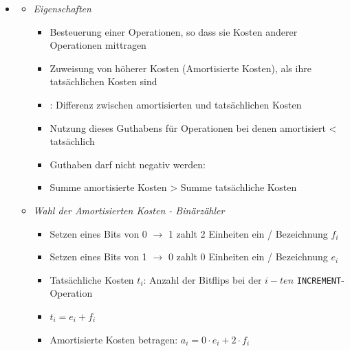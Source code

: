 \documentclass[
    12pt,
    a4paper,
    ngerman,
    color=3b,%
    marginpar=false,
    colorback=false,
    leqno,
]{tudaexercise}
\begin{document}
\begin{itemize}
\begin{itemize}
\begin{itemize}
                    \end{itemize}
            \end{itemize}

\pagebreak

        \item {}
            \begin{itemize}
                \item \textit{Eigenschaften}
                    \begin{itemize}
                        \item Besteuerung einer Operationen, so dass sie Kosten anderer Operationen mittragen
                        \item Zuweisung von höherer Kosten (Amortisierte Kosten), als ihre tatsächlichen Kosten sind
                        \item {}: Differenz zwischen amortisierten und tatsächlichen Kosten
                        \item Nutzung dieses Guthabens für Operationen bei denen amortisiert < tatsächlich
                        \item Guthaben darf nicht negativ werden:
                        \item[] Summe amortisierte Kosten > Summe tatsächliche Kosten
                    \end{itemize}

                \item \textit{Wahl der Amortisierten Kosten - Binärzähler}
                    \begin{itemize}
                        \item Setzen eines Bits von 0 $\rightarrow$ 1 zahlt 2 Einheiten ein / Bezeichnung $f_i$
                        \item Setzen eines Bits von 1 $\rightarrow$ 0 zahlt 0 Einheiten ein / Bezeichnung $e_i$
                        \item Tatsächliche Kosten $t_i$: Anzahl der Bitflips bei der $i-ten$ \texttt{INCREMENT}-Operation
                        \item[] $t_i = e_i + f_i$
                        \item Amortisierte Kosten betragen: $a_i = 0 \cdot e_i + 2 \cdot f_i$ 
                    \end{itemize}


\end{itemize}
\end{itemize}
\end{document}

